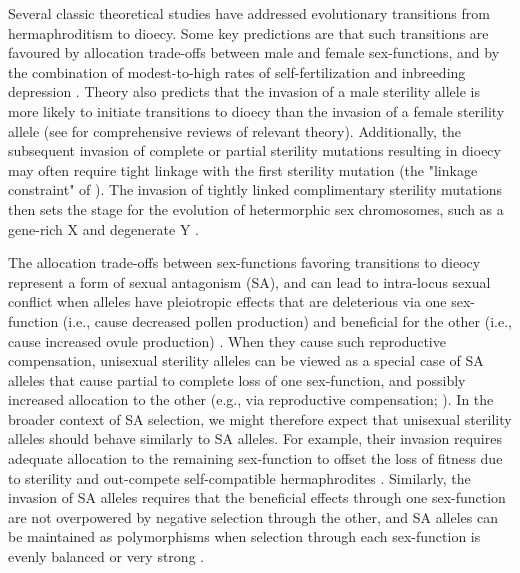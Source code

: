 \documentclass[9pt,twocolumn,twoside,lineno]{gsajnl}
\begin{document}
Several classic theoretical studies have addressed evolutionary transitions from hermaphroditism to dioecy. Some key predictions are that such transitions are favoured by allocation trade-offs between male and female sex-functions, and by the combination of modest-to-high rates of self-fertilization and inbreeding depression \citep{Lewis1941,Lloyd1975,Lloyd1976,Charlesworth1978a}. Theory also predicts that the invasion of a male sterility allele is more likely to initiate transitions to dioecy than the invasion of a female sterility allele (see \citealt{Charlesworth1999,Charlesworth2006} for comprehensive reviews of relevant theory). Additionally, the subsequent invasion of complete or partial sterility mutations resulting in dioecy may often require tight linkage with the first sterility mutation (the "linkage constraint" of \citealt{Charlesworth1978a}). The invasion of tightly linked complimentary sterility mutations then sets the stage for the evolution of hetermorphic sex chromosomes, such as a gene-rich X and degenerate Y \citep{Rice1987,Bachtrog2006,Charlesworth2002,Qiuetal2013}. 

The allocation trade-offs between sex-functions favoring transitions to dieocy represent a form of sexual antagonism (SA), and can lead to intra-locus sexual conflict when alleles have pleiotropic effects that are deleterious via one sex-function (i.e., cause decreased pollen production) and beneficial for the other (i.e., cause increased ovule production) \citep{JordanConnallon2014,Olito2016}. When they cause such reproductive compensation, unisexual sterility alleles can be viewed as a special case of SA alleles that cause partial to complete loss of one sex-function, and possibly increased allocation to the other (e.g., via reproductive compensation; \citealt{Lewis1941,Lloyd1975,Charlesworth1978a}). In the broader context of SA selection, we might therefore expect that unisexual sterility alleles should behave similarly to SA alleles. For example, their invasion requires adequate allocation to the remaining sex-function to offset the loss of fitness due to sterility and out-compete self-compatible hermaphrodites \citep{Charlesworth1978a}. Similarly, the invasion of SA alleles requires that the beneficial effects through one sex-function are not overpowered by negative selection through the other, and SA alleles can be maintained as polymorphisms when selection through each sex-function is evenly balanced or very strong \citep{Kidwell1977,JordanConnallon2014}. 
\end{document}
